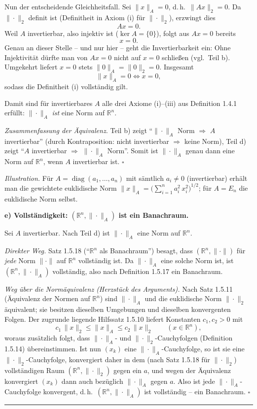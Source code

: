 \documentclass[a4paper,11pt]{article}
\begin{document}
Nun der entscheidende Gleichheitsfall. Sei $\|x\|_A=0$, d.\,h.\ $\|Ax\|_2=0$. Da $\|\cdot\|_2$ definit ist (Definitheit in Axiom (i) für $\|\cdot\|_2$), erzwingt dies
\[
Ax=0 .
\]
Weil $A$ invertierbar, also injektiv ist ($\ker A=\{0\}$), folgt aus $Ax=0$ bereits
\[
x=0 .
\]
Genau an dieser Stelle -- und nur hier -- geht die Invertierbarkeit ein: Ohne Injektivität dürfte man von $Ax=0$ nicht auf $x=0$ schließen (vgl.\ Teil b). Umgekehrt liefert $x=0$ stets $\|0\|_A=\|0\|_2=0$. Insgesamt
\[
\|x\|_A=0 \iff x=0 ,
\]
sodass die Definitheit (i) vollständig gilt.

Damit sind für invertierbares $A$ alle drei Axiome (i)--(iii) aus Definition 1.4.1 erfüllt: $\|\cdot\|_A$ \emph{ist} eine Norm auf $\mathbb{R}^n$.

\emph{Zusammenfassung der Äquivalenz.} Teil b) zeigt ``$\|\cdot\|_A$ Norm $\Rightarrow$ $A$ invertierbar'' (durch Kontraposition: nicht invertierbar $\Rightarrow$ keine Norm), Teil d) zeigt ``$A$ invertierbar $\Rightarrow$ $\|\cdot\|_A$ Norm''. Somit ist $\|\cdot\|_A$ genau dann eine Norm auf $\mathbb{R}^n$, wenn $A$ invertierbar ist. \hfill$\square$

\emph{Illustration.} Für $A=\operatorname{diag}(a_1,\dots,a_n)$ mit sämtlich $a_i\neq 0$ (invertierbar) erhält man die gewichtete euklidische Norm $\|x\|_A=\bigl(\sum_{i=1}^n a_i^2\,x_i^2\bigr)^{1/2}$; für $A=E_n$ die euklidische Norm selbst.

\bigskip
\textbf{e) Vollständigkeit: $(\mathbb{R}^n,\|\cdot\|_A)$ ist ein Banachraum.}

Sei $A$ invertierbar. Nach Teil d) ist $\|\cdot\|_A$ eine Norm auf $\mathbb{R}^n$.

\emph{Direkter Weg.} Satz 1.5.18 (``$\mathbb{R}^n$ als Banachraum'') besagt, dass $(\mathbb{R}^n,\|\cdot\|)$ für \emph{jede} Norm $\|\cdot\|$ auf $\mathbb{R}^n$ vollständig ist. Da $\|\cdot\|_A$ eine solche Norm ist, ist $(\mathbb{R}^n,\|\cdot\|_A)$ vollständig, also nach Definition 1.5.17 ein Banachraum.

\emph{Weg über die Normäquivalenz (Herzstück des Arguments).} Nach Satz 1.5.11 (Äquivalenz der Normen auf $\mathbb{R}^n$) sind $\|\cdot\|_A$ und die euklidische Norm $\|\cdot\|_2$ äquivalent; sie besitzen dieselben Umgebungen und dieselben konvergenten Folgen. Der zugrunde liegende Hilfssatz 1.5.10 liefert Konstanten $c_1,c_2>0$ mit
\[
c_1\,\|x\|_2 \le \|x\|_A \le c_2\,\|x\|_2 \qquad (x\in\mathbb{R}^n),
\]
woraus zusätzlich folgt, dass $\|\cdot\|_A$- und $\|\cdot\|_2$-Cauchyfolgen (Definition 1.5.14) übereinstimmen. Ist nun $(x_k)$ eine $\|\cdot\|_A$-Cauchyfolge, so ist sie eine $\|\cdot\|_2$-Cauchyfolge, konvergiert daher in dem (nach Satz 1.5.18 für $\|\cdot\|_2$) vollständigen Raum $(\mathbb{R}^n,\|\cdot\|_2)$ gegen ein $a$, und wegen der Äquivalenz konvergiert $(x_k)$ dann auch bezüglich $\|\cdot\|_A$ gegen $a$. Also ist jede $\|\cdot\|_A$-Cauchyfolge konvergent, d.\,h.\ $(\mathbb{R}^n,\|\cdot\|_A)$ ist vollständig -- ein Banachraum. \hfill$\square$\par\bigskip\hrule\bigskip
\end{document}
